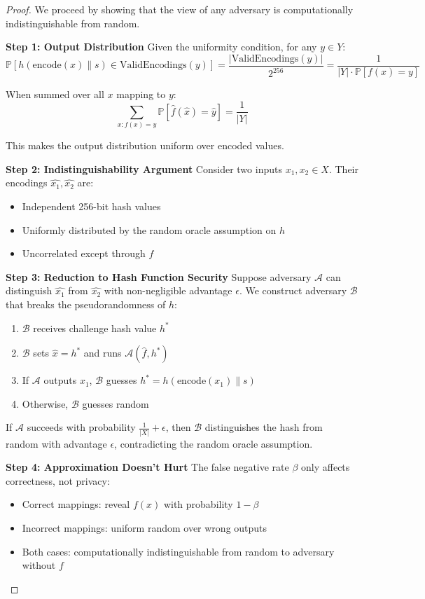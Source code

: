 \documentclass[11pt]{article}
\newcommand{\Obv}[1]{\widehat{#1}}
\newcommand{\ValidEnc}[1]{\text{ValidEncodings}(#1)}
\newcommand{\Encode}[1]{\text{encode}(#1)}
\newcommand{\Hash}[1]{h(#1)}
\newcommand{\Prob}[1]{\mathbb{P}[#1]}
\begin{document}
\begin{proof}
We proceed by showing that the view of any adversary is computationally indistinguishable from random.

\textbf{Step 1: Output Distribution}
Given the uniformity condition, for any $y \in Y$:
\[
\Prob{\Hash{\Encode{x} \| s} \in \ValidEnc{y}} = \frac{|\ValidEnc{y}|}{2^{256}} = \frac{1}{|Y| \cdot \Prob{f(x) = y}}
\]

When summed over all $x$ mapping to $y$:
\[
\sum_{x: f(x)=y} \Prob{\Obv{f}(\Obv{x}) = \Obv{y}} = \frac{1}{|Y|}
\]

This makes the output distribution uniform over encoded values.

\textbf{Step 2: Indistinguishability Argument}
Consider two inputs $x_1, x_2 \in X$. Their encodings $\Obv{x_1}, \Obv{x_2}$ are:
\begin{itemize}
    \item Independent 256-bit hash values
    \item Uniformly distributed by the random oracle assumption on $h$
    \item Uncorrelated except through $f$
\end{itemize}

\textbf{Step 3: Reduction to Hash Function Security}
Suppose adversary $\mathcal{A}$ can distinguish $\Obv{x_1}$ from $\Obv{x_2}$ with non-negligible advantage $\epsilon$. We construct adversary $\mathcal{B}$ that breaks the pseudorandomness of $h$:

\begin{enumerate}
    \item $\mathcal{B}$ receives challenge hash value $h^*$
    \item $\mathcal{B}$ sets $\Obv{x} = h^*$ and runs $\mathcal{A}(\Obv{f}, h^*)$
    \item If $\mathcal{A}$ outputs $x_1$, $\mathcal{B}$ guesses $h^* = \Hash{\Encode{x_1} \| s}$
    \item Otherwise, $\mathcal{B}$ guesses random
\end{enumerate}

If $\mathcal{A}$ succeeds with probability $\frac{1}{|X|} + \epsilon$, then $\mathcal{B}$ distinguishes the hash from random with advantage $\epsilon$, contradicting the random oracle assumption.

\textbf{Step 4: Approximation Doesn't Hurt}
The false negative rate $\beta$ only affects correctness, not privacy:
\begin{itemize}
    \item Correct mappings: reveal $f(x)$ with probability $1-\beta$
    \item Incorrect mappings: uniform random over wrong outputs
    \item Both cases: computationally indistinguishable from random to adversary without $f$
\end{itemize}
\end{proof}
\end{document}
